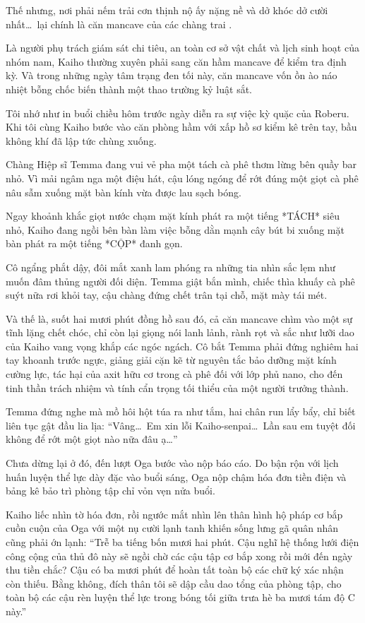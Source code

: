 \documentclass[../main.tex]{subfiles}
\begin{document}
Thế nhưng, nơi phải nếm trải cơn thịnh nộ ấy nặng nề và dở khóc dở cười nhất\dots\ lại chính là căn mancave của các chàng trai \hls.

Là người phụ trách giám sát chi tiêu, an toàn cơ sở vật chất và lịch sinh hoạt của nhóm nam, Kaiho thường xuyên phải sang căn hầm mancave để kiểm tra định kỳ. Và trong những ngày tâm trạng đen tối này, căn mancave vốn ồn ào náo nhiệt bỗng chốc biến thành một thao trường kỷ luật sắt.

Tôi nhớ như in buổi chiều hôm trước ngày diễn ra sự việc kỳ quặc của Roberu. Khi tôi cùng Kaiho bước vào căn phòng hầm với xấp hồ sơ kiểm kê trên tay, bầu không khí đã lập tức chùng xuống.

Chàng Hiệp sĩ Temma đang vui vẻ pha một tách cà phê thơm lừng bên quầy bar nhỏ. Vì mải ngâm nga một điệu hát, cậu lóng ngóng để rớt đúng một giọt cà phê nâu sẫm xuống mặt bàn kính vừa được lau sạch bóng.

Ngay khoảnh khắc giọt nước chạm mặt kính phát ra một tiếng *TÁCH* siêu nhỏ, Kaiho đang ngồi bên bàn làm việc bỗng dằn mạnh cây bút bi xuống mặt bàn phát ra một tiếng *CỘP* đanh gọn.

Cô ngẩng phắt dậy, đôi mắt xanh lam phóng ra những tia nhìn sắc lẹm như muốn đâm thủng người đối diện. Temma giật bắn mình, chiếc thìa khuấy cà phê suýt nữa rơi khỏi tay, cậu chàng đứng chết trân tại chỗ, mặt mày tái mét.

Và thế là, suốt hai mươi phút đồng hồ sau đó, cả căn mancave chìm vào một sự tĩnh lặng chết chóc, chỉ còn lại giọng nói lanh lảnh, rành rọt và sắc như lưỡi dao của Kaiho vang vọng khắp các ngóc ngách. Cô bắt Temma phải đứng nghiêm hai tay khoanh trước ngực, giảng giải cặn kẽ từ nguyên tắc bảo dưỡng mặt kính cường lực, tác hại của axit hữu cơ trong cà phê đối với lớp phủ nano, cho đến tinh thần trách nhiệm và tính cẩn trọng tối thiểu của một người trưởng thành.

Temma đứng nghe mà mồ hôi hột túa ra như tắm, hai chân run lẩy bẩy, chỉ biết liên tục gật đầu lia lịa: ``Vâng\dots\ Em xin lỗi Kaiho-senpai\dots\ Lần sau em tuyệt đối không để rớt một giọt nào nữa đâu ạ\dots''

Chưa dừng lại ở đó, đến lượt Oga bước vào nộp báo cáo. Do bận rộn với lịch huấn luyện thể lực dày đặc vào buổi sáng, Oga nộp chậm hóa đơn tiền điện và bảng kê bảo trì phòng tập chỉ vỏn vẹn nửa buổi.

Kaiho liếc nhìn tờ hóa đơn, rồi ngước mắt nhìn lên thân hình hộ pháp cơ bắp cuồn cuộn của Oga với một nụ cười lạnh tanh khiến sống lưng gã quân nhân cũng phải ớn lạnh: ``Trễ ba tiếng bốn mươi hai phút. Cậu nghĩ hệ thống lưới điện công cộng của thủ đô này sẽ ngồi chờ các cậu tập cơ bắp xong rồi mới đến ngày thu tiền chắc? Cậu có ba mươi phút để hoàn tất toàn bộ các chữ ký xác nhận còn thiếu. Bằng không, đích thân tôi sẽ dập cầu dao tổng của phòng tập, cho toàn bộ các cậu rèn luyện thể lực trong bóng tối giữa trưa hè ba mươi tám độ C này.''
\end{document}
